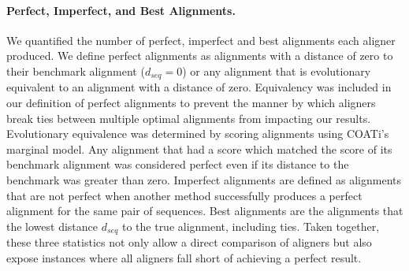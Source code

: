 \documentclass[12pt,letterpaper]{article}
\newcommand{\cyan}[1]{\textcolor{cyan}{#1}}
\begin{document}



\paragraph{Perfect, Imperfect, and Best Alignments.}
We quantified the number of perfect, imperfect and best alignments each aligner produced. We define perfect alignments as alignments with a distance of zero to their benchmark alignment ($d_{seq} = 0$) or any alignment that is evolutionary equivalent to an alignment with a distance of zero. Equivalency was included in our definition of perfect alignments to prevent the manner by which aligners break ties between multiple optimal alignments from impacting our results. Evolutionary equivalence was determined by scoring alignments using COATi's marginal model. Any alignment that had a score which matched the score of its benchmark alignment was considered perfect even if its distance to the benchmark was greater than zero.
%
Imperfect alignments are defined as alignments that are not perfect when another method successfully produces a perfect alignment for the same pair of sequences.
%
Best alignments are the alignments that the lowest distance $d_{seq}$ to the true alignment, including ties.
%
Taken together, these three statistics not only allow a direct comparison of aligners but also expose instances where all aligners fall short of achieving a perfect result.


\end{document}
